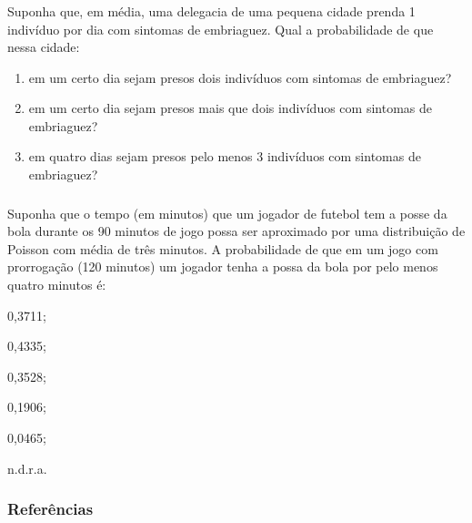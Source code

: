 \documentclass[14pt,aspectratio=1610]{beamer}
\begin{document}
\begin{frame}{}
\frametitle{}
\begin{block}{}
\justifying
Suponha que, em média, uma delegacia de uma pequena cidade prenda 1 indivíduo por dia com sintomas de embriaguez. Qual a probabilidade de que nessa cidade:
\begin{enumerate}
\item\label{examp:Poi3a} em um certo dia sejam presos dois indivíduos com sintomas de embriaguez?
\item\label{examp:Poi3b} em um certo dia sejam presos mais que dois indivíduos com sintomas de embriaguez?
\item\label{examp:Poi3c} em quatro dias sejam presos pelo menos 3 indivíduos com sintomas de embriaguez?
\end{enumerate}
\end{block}
\end{frame}

\begin{frame}{}
\frametitle{}
\begin{block}{}
\justifying
Suponha que o tempo (em minutos) que um jogador de futebol tem a posse da bola durante os 90 minutos de jogo possa ser aproximado por uma distribui\c{c}\~{a}o de Poisson com m\'{e}dia de tr\^{e}s minutos. A probabilidade de que em um jogo com prorroga\c{c}\~{a}o (120 minutos) um jogador tenha a possa da bola por pelo menos quatro minutos \'{e}:
\begin{enumerate}
\begin{multicols}{3}
\item 0,3711;
\item 0,4335;
\item 0,3528;
\item 0,1906;
\item 0,0465;
\item\label{corr03} n.d.r.a.
\end{multicols}
\end{enumerate}
\end{block}
\nocite{roteiro}
\nocite{Morettin09, Apostila, eric, montgomery2016, meyer1982probabilidade, Bastos2025}
\end{frame}

\begin{frame}[allowframebreaks]
\frametitle{\bf Referências}
\printbibliography
\end{frame}
\end{document}
